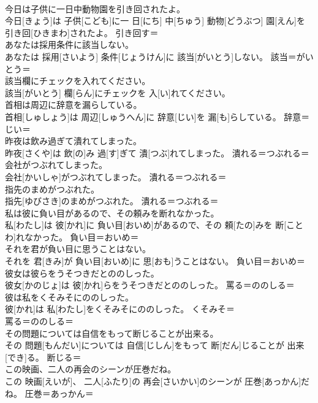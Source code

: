 \documentclass[8pt]{extreport}
\begin{document}
\begin{CJK}{UTF8}{min}
\\	今日は子供に一日中動物園を引き回されたよ。	
\\	今日[きょう]は 子供[こども]に一 日[にち] 中[ちゅう] 動物[どうぶつ] 園[えん]を 引き回[ひきまわ]されたよ。	引き回す＝ 
\\	あなたは採用条件に該当しない。	
\\	あなたは 採用[さいよう] 条件[じょうけん]に 該当[がいとう]しない。	該当＝がいとう＝ 
\\	該当欄にチェックを入れてください。	
\\	該当[がいとう] 欄[らん]にチェックを 入[い]れてください。	
\\	首相は周辺に辞意を漏らしている。	
\\	首相[しゅしょう]は 周辺[しゅうへん]に 辞意[じい]を 漏[も]らしている。	辞意＝じい＝ 
\\	昨夜は飲み過ぎて潰れてしまった。	
\\	昨夜[さくや]は 飲[の]み 過[す]ぎて 潰[つぶ]れてしまった。	潰れる＝つぶれる＝ 
\\	会社がつぶれてしまった。	
\\	会社[かいしゃ]がつぶれてしまった。	潰れる＝つぶれる＝ 
\\	指先のまめがつぶれた。	
\\	指先[ゆびさき]のまめがつぶれた。	潰れる＝つぶれる＝ 
\\	私は彼に負い目があるので、その頼みを断れなかった。	
\\	私[わたし]は 彼[かれ]に 負い目[おいめ]があるので、その 頼[たの]みを 断[ことわ]れなかった。	負い目＝おいめ＝ 
\\	それを君が負い目に思うことはない。	
\\	それを 君[きみ]が 負い目[おいめ]に 思[おも]うことはない。	負い目＝おいめ＝ 
\\	彼女は彼らをうそつきだとののしった。	
\\	彼女[かのじょ]は 彼[かれ]らをうそつきだとののしった。	罵る＝ののしる＝ 
\\	彼は私をくそみそにののしった。	
\\	彼[かれ]は 私[わたし]をくそみそにののしった。	くそみそ＝ 
\\	罵る＝ののしる＝ 
\\	その問題については自信をもって断じることが出来る。	
\\	その 問題[もんだい]については 自信[じしん]をもって 断[だん]じることが 出来[でき]る。	断じる＝ 
\\	この映画、二人の再会のシーンが圧巻だね。	
\\	この 映画[えいが]、 二人[ふたり]の 再会[さいかい]のシーンが 圧巻[あっかん]だね。	圧巻＝あっかん＝ 

\end{CJK}
\end{document}
